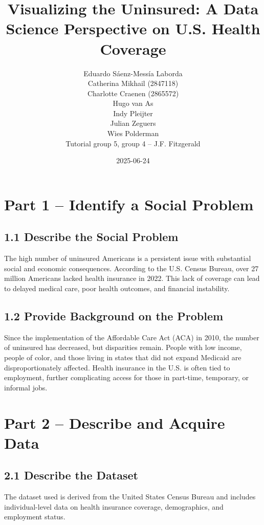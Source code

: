 \documentclass[
]{article}
\title{Visualizing the Uninsured: A Data Science Perspective on U.S.
Health Coverage}
\author{Eduardo Sáenz-Messía Laborda\\
Catherina Mikhail (2847118)\\
Charlotte Craenen (2865572)\\
Hugo van As\\
Indy Pleijter\\
Julian Zeguers\\
Wies Polderman\\
Tutorial group 5, group 4 -- J.F. Fitzgerald}
\date{2025-06-24}
\begin{document}
\maketitle

\section{Part 1 -- Identify a Social
Problem}\label{part-1-identify-a-social-problem}

\subsection{1.1 Describe the Social
Problem}\label{describe-the-social-problem}

The high number of uninsured Americans is a persistent issue with
substantial social and economic consequences. According to the U.S.
Census Bureau, over 27 million Americans lacked health insurance in
2022. This lack of coverage can lead to delayed medical care, poor
health outcomes, and financial instability.

\subsection{1.2 Provide Background on the
Problem}\label{provide-background-on-the-problem}

Since the implementation of the Affordable Care Act (ACA) in 2010, the
number of uninsured has decreased, but disparities remain. People with
low income, people of color, and those living in states that did not
expand Medicaid are disproportionately affected. Health insurance in the
U.S. is often tied to employment, further complicating access for those
in part-time, temporary, or informal jobs.

\section{Part 2 -- Describe and Acquire
Data}\label{part-2-describe-and-acquire-data}

\subsection{2.1 Describe the Dataset}\label{describe-the-dataset}

The dataset used is derived from the United States Census Bureau and
includes individual-level data on health insurance coverage,
demographics, and employment status.
\end{document}
